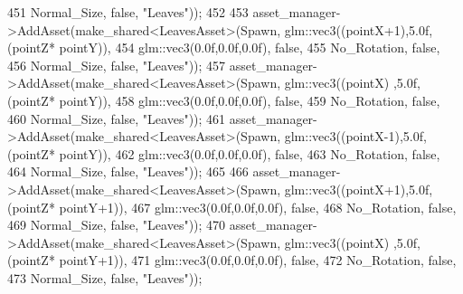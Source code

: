 \begin{DoxyCode}
451                                                              Normal\_Size, \textcolor{keyword}{false}, \textcolor{stringliteral}{"Leaves"})); 
452 
453             asset\_manager->AddAsset(make\_shared<LeavesAsset>(Spawn, glm::vec3((pointX+1),5.0f,(pointZ*
      pointY)),
454                                                              glm::vec3(0.0f,0.0f,0.0f), \textcolor{keyword}{false},
455                                                              No\_Rotation, \textcolor{keyword}{false},
456                                                              Normal\_Size, \textcolor{keyword}{false}, \textcolor{stringliteral}{"Leaves"}));
457             asset\_manager->AddAsset(make\_shared<LeavesAsset>(Spawn, glm::vec3((pointX)  ,5.0f,(pointZ*
      pointY)),
458                                                              glm::vec3(0.0f,0.0f,0.0f), \textcolor{keyword}{false},
459                                                              No\_Rotation, \textcolor{keyword}{false},
460                                                              Normal\_Size, \textcolor{keyword}{false}, \textcolor{stringliteral}{"Leaves"}));
461             asset\_manager->AddAsset(make\_shared<LeavesAsset>(Spawn, glm::vec3((pointX-1),5.0f,(pointZ*
      pointY)),
462                                                              glm::vec3(0.0f,0.0f,0.0f), \textcolor{keyword}{false},
463                                                              No\_Rotation, \textcolor{keyword}{false},
464                                                              Normal\_Size, \textcolor{keyword}{false}, \textcolor{stringliteral}{"Leaves"}));
465  
466             asset\_manager->AddAsset(make\_shared<LeavesAsset>(Spawn, glm::vec3((pointX+1),5.0f,(pointZ*
      pointY+1)),
467                                                              glm::vec3(0.0f,0.0f,0.0f), \textcolor{keyword}{false},
468                                                              No\_Rotation, \textcolor{keyword}{false},
469                                                              Normal\_Size, \textcolor{keyword}{false}, \textcolor{stringliteral}{"Leaves"}));
470             asset\_manager->AddAsset(make\_shared<LeavesAsset>(Spawn, glm::vec3((pointX)  ,5.0f,(pointZ*
      pointY+1)),
471                                                              glm::vec3(0.0f,0.0f,0.0f), \textcolor{keyword}{false},
472                                                              No\_Rotation, \textcolor{keyword}{false},
473                                                              Normal\_Size, \textcolor{keyword}{false}, \textcolor{stringliteral}{"Leaves"}));

\end{DoxyCode}
